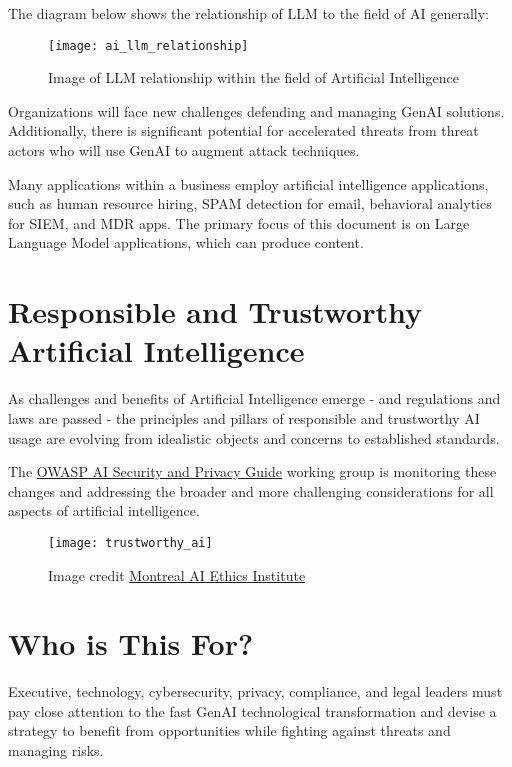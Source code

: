 \clearpage
The diagram below shows the relationship of LLM to the field of AI generally:

\begin{figure}[h]
  \centering
  \texttt{[image: ai\_llm\_relationship]}
  \caption{Image of LLM relationship within the field of Artificial Intelligence}
  \label{fig:ai-llm-relationship}
\end{figure}

Organizations will face new challenges defending and managing GenAI solutions.
Additionally, there is significant potential for accelerated threats from threat
actors who will use GenAI to augment attack techniques.

Many applications within a business employ artificial intelligence applications,
such as human resource hiring, SPAM detection for email, behavioral analytics
for SIEM, and MDR apps. The primary focus of this document is on Large Language
Model applications, which can produce content.

\clearpage
\section{Responsible and Trustworthy Artificial Intelligence}
As challenges and benefits of Artificial Intelligence emerge - and regulations
and laws are passed - the principles and pillars of responsible and trustworthy
AI usage are evolving from idealistic objects and concerns to established
standards.

The \href{https://owasp.org/www-project-ai-security-and-privacy-guide/}{OWASP AI Security and Privacy Guide}
working group is monitoring these changes and addressing the broader and more
challenging considerations for all aspects of artificial intelligence.

\begin{figure}[h]
  \centering
  \texttt{[image: trustworthy\_ai]}
  \caption{Image credit \href{https://montrealethics.ai/}{Montreal AI Ethics Institute}}
  \label{fig:trustworthy-ai}
\end{figure}

\clearpage
\section{Who is This For?}
Executive, technology, cybersecurity, privacy, compliance, and legal leaders
must pay close attention to the fast GenAI technological transformation and
devise a strategy to benefit from opportunities while fighting against threats
and managing risks.

